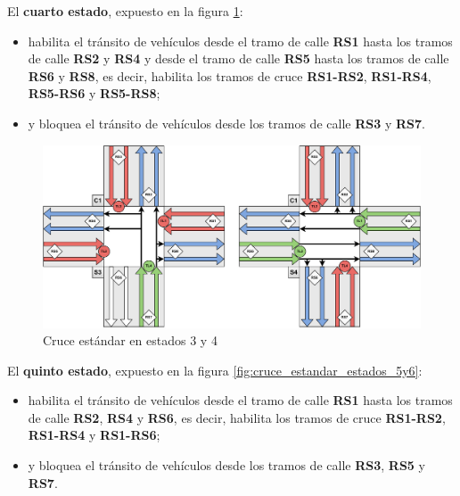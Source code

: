 El \textbf{cuarto estado}, expuesto en la figura \ref{fig:cruce_estandar_estados_3y4}:
\begin{itemize}
    \item habilita el tránsito de vehículos desde el tramo de calle \textbf{RS1} hasta los tramos de calle \textbf{RS2} y \textbf{RS4} y desde el tramo de calle \textbf{RS5} hasta los tramos de calle \textbf{RS6} y \textbf{RS8}, es decir, habilita los tramos de cruce \textbf{RS1-RS2}, \textbf{RS1-RS4}, \textbf{RS5-RS6} y \textbf{RS5-RS8};
    \item y bloquea el tránsito de vehículos desde los tramos de calle \textbf{RS3} y \textbf{RS7}.
\end{itemize}
\begin{figure}[H]
    \centering
    \includegraphics[width=1\linewidth]{text/image/DCruc-CE-Estados3y4.pdf}
    \caption{Cruce estándar en estados 3 y 4}
    \label{fig:cruce_estandar_estados_3y4}
\end{figure}

\newpage
El \textbf{quinto estado}, expuesto en la figura \ref{fig:cruce_estandar_estados_5y6}:
\begin{itemize}
    \item habilita el tránsito de vehículos desde el tramo de calle \textbf{RS1} hasta los tramos de calle \textbf{RS2}, \textbf{RS4} y \textbf{RS6}, es decir, habilita los tramos de cruce \textbf{RS1-RS2}, \textbf{RS1-RS4} y \textbf{RS1-RS6};
    \item y bloquea el tránsito de vehículos desde los tramos de calle \textbf{RS3}, \textbf{RS5} y \textbf{RS7}.
\end{itemize}

